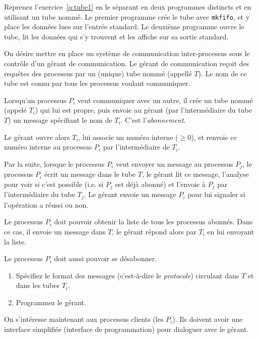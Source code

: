 \question

Reprenez l'exercice~\ref {q:tube1} en le séparant en deux
programmes distincts et en utilisant un tube nommé.  Le premier
programme crée le tube avec {\tt mkfifo}, et y place les données lues
sur l'entrée standard.  Le deuxième programme ouvre le tube, lit les
données qui s'y trouvent et les affiche sur sa sortie standard.


\question

On désire mettre en place un système de communication inter-processus
sous le contrôle d'un gérant de communication.  Le gérant de
communication reçoit des requêtes des processus par un (unique) tube
nommé (appellé $T$). Le nom de ce tube est connu par tous les processus
voulant communiquer.

Lorsqu'un processus $P_i$ veut communiquer avec un autre, il crée un
tube nommé (appelé $T_i$) qui lui est propre, puis envoie au gérant (par
l'intermédiaire du tube $T$) un message spécifiant le nom de $T_i$.
C'est l'{\em abonnement}.

Le gérant ouvre alors $T_i$, lui associe un numéro interne ($\geq 0$),
et renvoie ce numéro interne au processus $P_i$ par l'intermédiaire de
$T_i$.

Par la suite, lorsque le processus $P_i$ veut envoyer un message au
processus $P_j$, le processus $P_i$ écrit un message dans le tube $T$,
le gérant lit ce message, l'analyse pour voir si c'est possible (i.e.
si $P_j$ est déjà abonné) et l'envoie à $P_j$ par l'intermédiaire du
tube $T_j$. Le gérant envoie un message $P_i$ pour lui signaler si
l'opération a réussi ou non.

Le processus $P_i$ doit pouvoir obtenir la liste de tous les processus
abonnés. Dans ce cas, il envoie un message dans $T$, le gérant répond
alors par $T_i$ en lui envoyant la liste.

Le processus $P_i$ doit aussi pouvoir se désabonner.

\begin {enumerate}
    \item Spécifiez le format des messages (c'est-à-dire le {\em
	protocole}) circulant dans $T$ et dans les tubes $T_i$.

    \item Programmez le gérant.

\end {enumerate}


\question

On s'intéresse maintenant aux processus clients (les $P_i$). Ils
doivent avoir une interface simplifiée (interface de programmation)
pour dialoguer avec le gérant.

